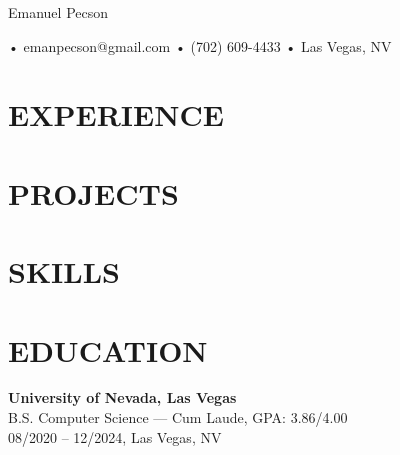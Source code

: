 \documentclass[letterpaper,10pt]{article}
\begin{document}
\begin{center}
  {\fontsize{20}{20}\robotoregular Emanuel Pecson} \\

	\vspace{0.5em}

	\hspace{0.6em}•\hspace{0.6em}
	emanpecson@gmail.com
	\hspace{0.6em}•\hspace{0.6em}
	(702) 609-4433
	\hspace{0.6em}•\hspace{0.6em}
	Las Vegas, NV
\end{center}

\section*{EXPERIENCE}




\section*{PROJECTS}



\section*{SKILLS}


\section*{EDUCATION}
\textbf{University of Nevada, Las Vegas} \\
B.S. Computer Science — \textnormal{Cum Laude}, GPA: 3.86/4.00 \\
08/2020 – 12/2024, Las Vegas, NV
\end{document}
